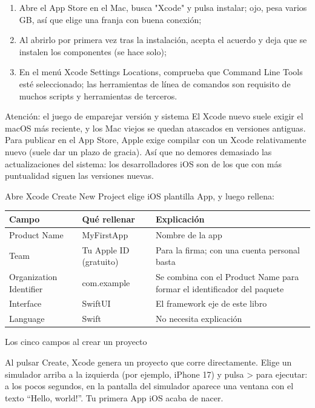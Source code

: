 \begin{enumerate}
  \item Abre el App Store en el Mac, busca "Xcode" y pulsa instalar; ojo, pesa varios GB, así que elige una franja con buena conexión;
  \item Al abrirlo por primera vez tras la instalación, acepta el acuerdo y deja que se instalen los componentes (se hace solo);
  \item En el menú Xcode Settings Locations, comprueba que Command Line Tools esté seleccionado; las herramientas de línea de comandos son requisito de muchos scripts y herramientas de terceros.
\end{enumerate}

\begin{tcbwarn}{Atención: el juego de emparejar versión y sistema}
El Xcode nuevo suele exigir el macOS más reciente, y los Mac viejos se quedan atascados en versiones antiguas. Para publicar en el App Store, Apple exige compilar con un Xcode relativamente nuevo (suele dar un plazo de gracia). Así que no demores demasiado las actualizaciones del sistema: los desarrolladores iOS son de los que con más puntualidad siguen las versiones nuevas.

\end{tcbwarn}


Abre Xcode Create New Project elige iOS plantilla App, y luego rellena:

\begin{center}
\begin{tabularx}{\linewidth}{|X|X|X|}
\hline
\textbf{Campo} & \textbf{Qué rellenar} & \textbf{Explicación} \tabularnewline
\hline
Product Name & MyFirstApp & Nombre de la app \tabularnewline
Team & Tu Apple ID (gratuito) & Para la firma; con una cuenta personal basta \tabularnewline
Organization Identifier & com.example & Se combina con el Product Name para formar el identificador del paquete \tabularnewline
Interface & SwiftUI & El framework eje de este libro \tabularnewline
Language & Swift & No necesita explicación \tabularnewline
\hline
\end{tabularx}
\end{center}

\begin{center}\small\color{gray}Los cinco campos al crear un proyecto\end{center}

Al pulsar Create, Xcode genera un proyecto que corre directamente. Elige un simulador arriba a la izquierda (por ejemplo, iPhone 17) y pulsa > para ejecutar: a los pocos segundos, en la pantalla del simulador aparece una ventana con el texto “Hello, world!”. Tu primera App iOS acaba de nacer.

